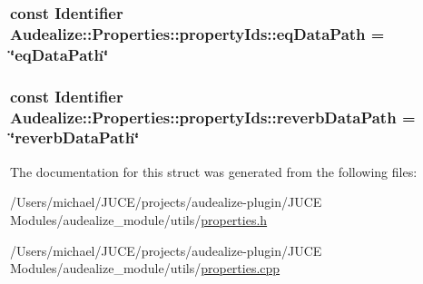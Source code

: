 \subsubsection[{\texorpdfstring{eq\+Data\+Path}{eqDataPath}}]{\setlength{\rightskip}{0pt plus 5cm}const Identifier Audealize\+::\+Properties\+::property\+Ids\+::eq\+Data\+Path = \char`\"{}eq\+Data\+Path\char`\"{}\hspace{0.3cm}{\ttfamily [static]}}\hypertarget{struct_audealize_1_1_properties_1_1property_ids_a0104341c16f19ea1043a55fe9a478c80}{}\label{struct_audealize_1_1_properties_1_1property_ids_a0104341c16f19ea1043a55fe9a478c80}
\subsubsection[{\texorpdfstring{reverb\+Data\+Path}{reverbDataPath}}]{\setlength{\rightskip}{0pt plus 5cm}const Identifier Audealize\+::\+Properties\+::property\+Ids\+::reverb\+Data\+Path = \char`\"{}reverb\+Data\+Path\char`\"{}\hspace{0.3cm}{\ttfamily [static]}}\hypertarget{struct_audealize_1_1_properties_1_1property_ids_a55966884d5356be5b001664c9a175f42}{}\label{struct_audealize_1_1_properties_1_1property_ids_a55966884d5356be5b001664c9a175f42}


The documentation for this struct was generated from the following files\+:\begin{DoxyCompactItemize}
\item 
/\+Users/michael/\+J\+U\+C\+E/projects/audealize-\/plugin/\+J\+U\+C\+E Modules/audealize\+\_\+module/utils/\hyperlink{properties_8h}{properties.\+h}\item 
/\+Users/michael/\+J\+U\+C\+E/projects/audealize-\/plugin/\+J\+U\+C\+E Modules/audealize\+\_\+module/utils/\hyperlink{properties_8cpp}{properties.\+cpp}\end{DoxyCompactItemize}
